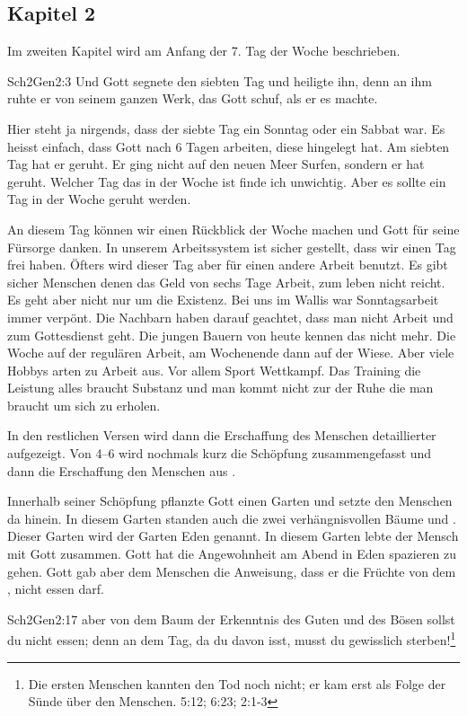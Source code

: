 


\subsection{Kapitel 2}
Im zweiten Kapitel wird am Anfang der 7. Tag der Woche beschrieben.
\begin{bibeltext}{Sch2}{Gen}{2:3}
	Und Gott segnete den siebten Tag und heiligte ihn, denn an ihm ruhte er von seinem ganzen Werk, das Gott schuf, als er es machte.
\end{bibeltext}
Hier steht ja nirgends, dass der siebte Tag ein Sonntag oder ein Sabbat war. Es heisst einfach, dass Gott nach 6 Tagen arbeiten, diese hingelegt hat. Am siebten Tag hat er geruht. Er ging nicht auf den neuen Meer Surfen, sondern er hat geruht. Welcher Tag das in der Woche ist finde ich unwichtig. Aber es sollte ein Tag in der Woche geruht werden.

An diesem Tag können wir einen Rückblick der Woche machen und Gott für seine Fürsorge danken. In unserem Arbeitssystem ist sicher gestellt, dass wir einen Tag frei haben. Öfters wird dieser Tag aber für einen andere Arbeit benutzt. Es gibt sicher Menschen denen das Geld von sechs Tage Arbeit, zum leben nicht reicht. Es geht aber nicht nur um die Existenz. Bei uns im Wallis war Sonntagsarbeit immer verpönt. Die Nachbarn haben darauf geachtet, dass man nicht Arbeit und zum Gottesdienst geht. Die jungen Bauern von heute kennen das nicht mehr. Die Woche auf der regulären Arbeit, am Wochenende dann auf der Wiese. Aber viele Hobbys arten zu Arbeit aus. Vor allem Sport Wettkampf. Das Training die Leistung alles braucht Substanz und man kommt nicht zur der Ruhe die man braucht um sich zu erholen.

In den restlichen Versen wird dann die Erschaffung des Menschen detaillierter aufgezeigt. Von 4--6 wird nochmals kurz die Schöpfung zusammengefasst und dann die Erschaffung den Menschen aus .

Innerhalb seiner Schöpfung pflanzte Gott einen Garten und setzte den Menschen da hinein. In diesem Garten standen auch die zwei verhängnisvollen Bäume  und . Dieser Garten wird der Garten Eden genannt. In diesem Garten lebte der Mensch mit Gott zusammen. Gott hat die Angewohnheit am Abend in Eden spazieren zu gehen. Gott gab aber dem Menschen die Anweisung, dass er die Früchte von dem , nicht essen darf.
\begin{bibeltext}{Sch2}{Gen}{2:17}
	aber von dem Baum der Erkenntnis des Guten und des Bösen sollst du nicht essen; denn an dem Tag, da du davon isst, musst du gewisslich sterben!\footnote{Die ersten Menschen kannten den Tod noch nicht; er kam erst als Folge der Sünde über den Menschen.  {5:12};  {6:23};  {2:1-3}}
\end{bibeltext}

